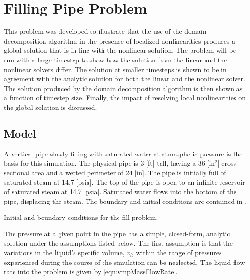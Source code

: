 
\section{Filling Pipe Problem}
\label{sect:vmp}
This problem was developed to illustrate that the use of the domain decomposition algorithm in the presence of localized nonlinearities produces a global solution that is in-line with the nonlinear solution.
The problem will be run with a large timestep to show how the solution from the linear and the nonlinear solvers differ.
The solution at smaller timesteps is shown to be in agreement with the analytic solution for both the linear and the nonlinear solver.
The solution produced by the domain decomposition algorithm is then shown as a function of timestep size.
Finally, the impact of resolving local nonlinearities on the global solution is discussed.

\subsection{Model}
\label{subsect:vmpModel}

A vertical pipe slowly filling with saturated water at atmospheric pressure is the basis for this simulation.
The physical pipe is 3 [ft] tall, having a 36 [in$^{2}$] cross-sectional area and a wetted perimeter of 24 [in].
The pipe is initially full of saturated steam at 14.7 [psia].
The top of the pipe is open to an infinite reservoir of saturated steam at 14.7 [psia].
Saturated water flows into the bottom of the pipe, displacing the steam.
The boundary and initial conditions are contained in .

\begin{table}[h!tb]
\centering
\singlespace

\caption{Initial and boundary conditions for the fill problem.}
\label{tab:vmpBCIC}
\end{table}

The pressure at a given point in the pipe has a simple, closed-form, analytic solution under the assumptions listed below.
The first assumption is that the variations in the liquid's specific volume, $v_{l}$, within the range of pressures experienced during the course of the simulation can be neglected.
The liquid flow rate into the problem is given by \eqref{eqn:vmpMassFlowRate}.

